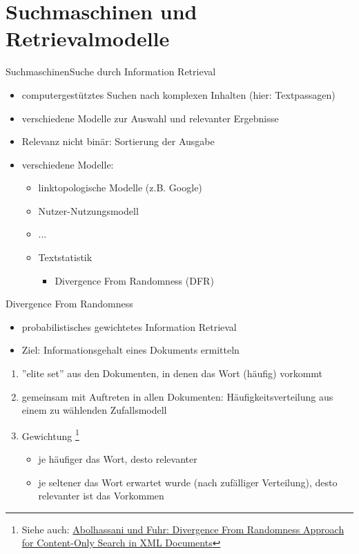 \documentclass{beamer}
\newcommand\blfootnote[1]{%
	\begingroup
	\renewcommand\thefootnote{}\footnote{#1}%
	\addtocounter{footnote}{-1}%
	\endgroup
}
\begin{document}
	\section{Suchmaschinen und Retrievalmodelle}
	\begin{frame}{Suchmaschinen}{Suche durch Information Retrieval}
		\begin{itemize}[<+->]
			\item computergestütztes Suchen nach komplexen Inhalten (hier: Textpassagen)
			\item verschiedene Modelle zur Auswahl und relevanter Ergebnisse
			\item Relevanz nicht binär: Sortierung der Ausgabe
			\item verschiedene Modelle:
			\begin{itemize}
				\item linktopologische Modelle (z.B. Google)
				\item Nutzer-Nutzungsmodell
				\item $\ldots$
				\item Textstatistik
				\begin{itemize}
					\item Divergence From Randomness (DFR)
				\end{itemize}
			\end{itemize}
		\end{itemize}
	\end{frame}

	\begin{frame}{Divergence From Randomness}
		\begin{itemize}
			\item probabilistisches gewichtetes Information Retrieval
			\item Ziel: Informationsgehalt eines Dokuments ermitteln
		\end{itemize}
		\begin{enumerate}[<+->]
			\item ''elite set'' aus den Dokumenten, in denen das Wort (häufig) vorkommt
			\item gemeinsam mit Auftreten in allen Dokumenten: Häufigkeitsverteilung aus einem zu wählenden Zufallsmodell
			\item Gewichtung \blfootnote{Siehe auch: \href{http://www.is.informatik.uni-duisburg.de/bib/pdf/ir/Abolhassani_Fuhr_04.pdf}{Abolhassani und Fuhr: Divergence From Randomness Approach for Content-Only Search in XML Documents}}
			\begin{itemize}
				\item je häufiger das Wort, desto relevanter
				\item je seltener das Wort erwartet wurde (nach zufälliger Verteilung), desto relevanter ist das Vorkommen
			\end{itemize}
		\end{enumerate}
	\end{frame}
	
\end{document}
